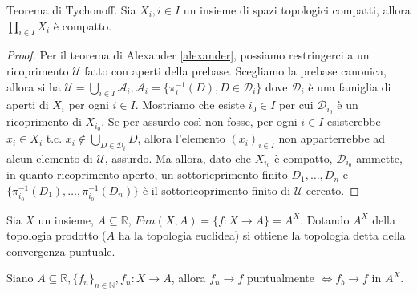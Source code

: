 \begin{thm}
  Teorema di Tychonoff. Sia $X_i, i \in I$ un insieme di spazi topologici compatti, allora $\displaystyle \prod_{i \in I} X_i$ è compatto.
\end{thm}

\begin{proof}
  Per il teorema di Alexander \ref{alexander}, possiamo restringerci a un ricoprimento $\mathcal{U}$ fatto con aperti della prebase. Scegliamo la prebase canonica, allora si ha $\displaystyle \mathcal{U}=\bigcup_{i \in I} \mathcal{A}_i, \mathcal{A}_i=\{\pi_i^{-1}(D), D \in \mathcal{D}_i\}$ dove $\mathcal{D}_i$ è una famiglia di aperti di $X_i$ per ogni $i \in I$.
  Mostriamo che esiste $i_0 \in I$ per cui $\mathcal{D}_{i_0}$ è un ricoprimento di $X_{i_0}$. Se per assurdo così non fosse, per ogni $i \in I$ esisterebbe $x_i \in X_i$ t.c. $\displaystyle x_i \not \in \bigcup_{D \in \mathcal{D}_i} D$, allora l'elemento $(x_i)_{i \in I}$ non apparterrebbe ad alcun elemento di $\mathcal{U}$, assurdo.
  Ma allora, dato che $X_{i_0}$ è compatto, $\mathcal{D}_{i_0}$ ammette, in quanto ricoprimento aperto, un sottoricprimento finito $D_1, \dots, D_n$ e $\{\pi_{i_0}^{-1}(D_1), \dots, \pi_{i_0}^{-1}(D_n)\}$ è il sottoricoprimento finito di $\mathcal{U}$ cercato.
\end{proof}

\begin{ex}
  Sia $X$ un insieme, $A \subseteq \mathbb{R}$, $Fun(X, A)=\{f:X \rightarrow A\}=A^X$. Dotando $A^X$ della topologia prodotto ($A$ ha la topologia euclidea) si ottiene la topologia detta della convergenza puntuale.
\end{ex}

\begin{lm}
  Siano $A \subseteq \mathbb{R}, \{f_n\}_{n \in \mathbb{N}}, f_n:X \rightarrow A$, allora $f_n \rightarrow f$ puntualmente $\Leftrightarrow f_b \rightarrow f$ in $A^X$.
\end{lm}

